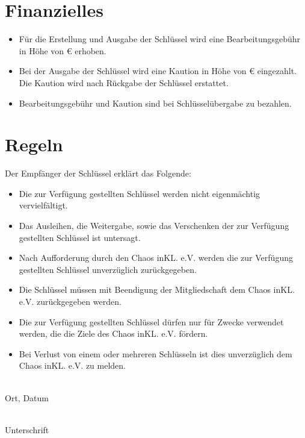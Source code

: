\documentclass[ngerman,a4paper]{scrartcl}
\newcommand{\bearbeitungsgebuehr}{
	\TextField[name=bg,width=2em,readonly=true]{}
}
\newcommand{\kaution}{
	\TextField[name=kaution,width=2em,,readonly=true]{}
}
\begin{document}
\begin{Form}
\section*{Finanzielles}
\begin{itemize}
 \item Für die Erstellung und Ausgabe der Schlüssel wird eine Bearbeitungsgebühr in Höhe von \bearbeitungsgebuehr€ erhoben.
 \item Bei der Ausgabe der Schlüssel wird eine Kaution in Höhe von \kaution€ eingezahlt. Die Kaution wird nach Rückgabe der Schlüssel erstattet.
 \item Bearbeitungsgebühr und Kaution sind bei Schlüsselübergabe zu bezahlen.
\end{itemize}

\section*{Regeln}
Der Empfänger der Schlüssel erklärt das Folgende:\\
\begin{itemize}
 \item Die zur Verfügung gestellten Schlüssel werden nicht eigenmächtig vervielfältigt.
 \item Das Ausleihen, die Weitergabe, sowie das Verschenken der zur Verfügung gestellten Schlüssel ist untersagt.
 \item Nach Aufforderung durch den Chaos inKL. e.V. werden die zur Verfügung gestellten Schlüssel unverzüglich zurückgegeben. 
 \item Die Schlüssel müssen mit Beendigung der Mitgliedschaft dem Chaos inKL. e.V. zurückgegeben werden.
 \item Die zur Verfügung gestellten Schlüssel dürfen nur für Zwecke verwendet werden, die die Ziele des Chaos inKL. e.V. fördern.
 \item Bei Verlust von einem oder mehreren Schlüsseln ist dies unverzüglich dem Chaos inKL. e.V. zu melden.
\end{itemize}
\vfill
\begin{minipage}{5cm}
 \dotfill\\
 Ort, Datum
\end{minipage}
\hspace{1cm}
\begin{minipage}{7cm}
 \dotfill\\
 Unterschrift
\end{minipage}
\end{Form}
\end{document}
